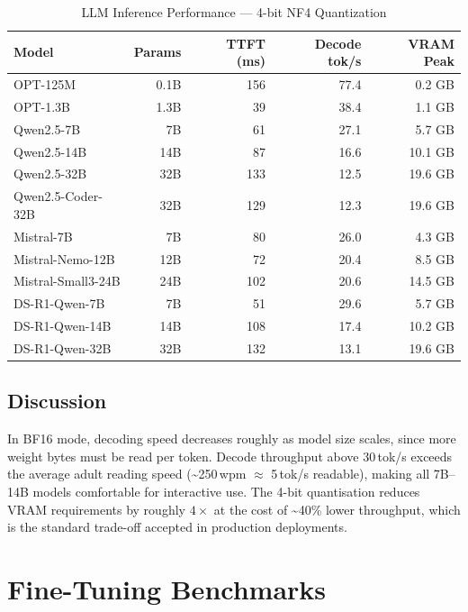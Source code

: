 \documentclass[11pt,a4paper]{article}
\begin{document}
\begin{table}[h!]
\centering
\caption{LLM Inference Performance --- 4-bit NF4 Quantization}
\label{tab:inf-4bit}
\begin{tabular}{lrrrr}
\toprule
\textbf{Model} & \textbf{Params} & \textbf{TTFT (ms)} & \textbf{Decode tok/s} & \textbf{VRAM Peak} \\
\midrule
OPT-125M           & 0.1B  & 156  & 77.4  & 0.2 GB \\
OPT-1.3B           & 1.3B  & 39   & 38.4  & 1.1 GB \\
Qwen2.5-7B         & 7B    & 61   & 27.1  & 5.7 GB \\
Qwen2.5-14B        & 14B   & 87   & 16.6  & 10.1 GB \\
Qwen2.5-32B        & 32B   & 133  & 12.5  & 19.6 GB \\
Qwen2.5-Coder-32B  & 32B   & 129  & 12.3  & 19.6 GB \\
Mistral-7B         & 7B    & 80   & 26.0  & 4.3 GB \\
Mistral-Nemo-12B   & 12B   & 72   & 20.4  & 8.5 GB \\
Mistral-Small3-24B & 24B   & 102  & 20.6  & 14.5 GB \\
DS-R1-Qwen-7B      & 7B    & 51   & 29.6  & 5.7 GB \\
DS-R1-Qwen-14B     & 14B   & 108  & 17.4  & 10.2 GB \\
DS-R1-Qwen-32B     & 32B   & 132  & 13.1  & 19.6 GB \\
\bottomrule
\end{tabular}
\end{table}

\newpage
\subsection{Discussion}
In BF16 mode, decoding speed decreases roughly as model size scales, since more
weight bytes must be read per token. Decode throughput above 30\,tok/s exceeds
the average adult reading speed (\textasciitilde{}250\,wpm $\approx$ 5\,tok/s readable),
making all 7B--14B models comfortable for interactive use. The 4-bit quantisation
reduces VRAM requirements by roughly $4\times$ at the cost of \textasciitilde{}40\%
lower throughput, which is the standard trade-off accepted in production deployments.

\section{Fine-Tuning Benchmarks}
\end{document}
